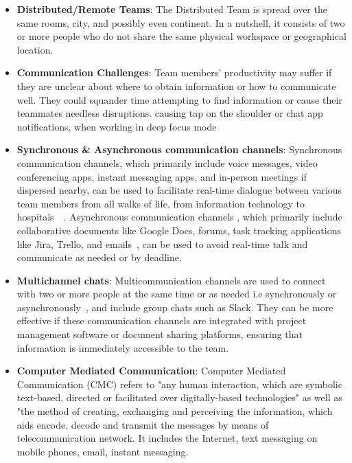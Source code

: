 \documentclass{llncs}
\begin{document}
 \begin{itemize}
    \item \textbf{Distributed/Remote Teams}: The Distributed Team is spread over the same rooms, city, and possibly even continent. In a nutshell, it consists of two or more people who do not share the same physical workspace or geographical location.~\cite{refbook1}\\
    \item \textbf{Communication Challenges}: Team members' productivity may suffer if they are unclear about where to obtain information or how to communicate well. They could squander time attempting to find information or cause their teammates needless disruptions. causing tap on the shoulder or chat app notifications, when working in deep focus mode ~\cite{refbook1}\\
    \item \textbf{Synchronous \& Asynchronous communication channels}: 
    Synchronous communication channels, which primarily include voice messages, video conferencing apps, instant messaging apps, and in-person meetings if dispersed nearby, can be used to facilitate real-time dialogue between various team members from all walks of life, from information technology to hospitals~\cite{refbook1}~\cite{refpaper1}.
    Asynchronous communication channels , which primarily include collaborative documents like Google Docs, forums, task tracking applications like Jira, Trello, and emails~\cite{refpaper2}, can be used to avoid real-time talk and communicate as needed or by deadline.~\cite{refbook1} \\
    \item \textbf{Multichannel chats}: Multicommunication channels are used to connect with two or more people at the same time or as needed i.e synchronously or asynchronously~\cite{refpaper3}, and include group chats such as Slack. They can be more effective if these communication channels are integrated with project management software or document sharing platforms, ensuring that information is immediately accessible to the team.~\cite{refpaper4}\\
    \item \textbf{Computer Mediated Communication}:  Computer Mediated Communication (CMC) refers to "any human interaction, which are symbolic text-based, directed or facilitated over digitally-based technologies" as well as "the method of creating, exchanging and perceiving the information, which aids encode, decode and transmit the messages by means of telecommunication network. It includes the Internet, text messaging on mobile phones, email, instant messaging.~\cite{refpaper5}
\end{itemize}
\end{document}
